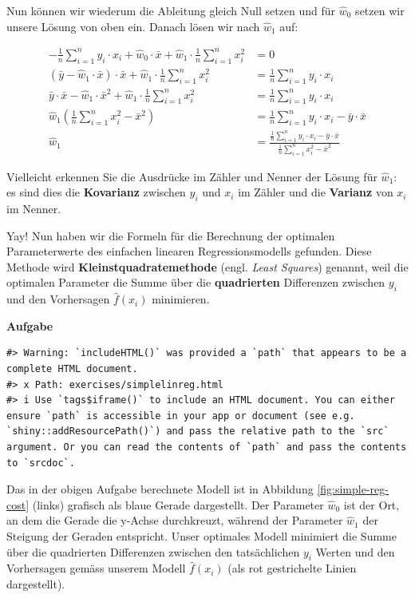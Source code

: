 \documentclass[
]{book}
\begin{document}
Nun können wir wiederum die Ableitung gleich Null setzen und für \(\hat{w}_0\) setzen wir unsere Lösung von oben ein. Danach lösen wir nach \(\hat{w}_1\) auf:

\begin{align}
-\frac{1}{n} \sum_{i=1}^{n} y_i \cdot x_i + \hat{w}_0 \cdot \bar{x} + \hat{w}_1 \cdot \frac{1}{n} \sum_{i=1}^{n} x_i^2 &= 0 \\
(\bar{y} - \hat{w}_1 \cdot \bar{x}) \cdot \bar{x} + \hat{w}_1 \cdot \frac{1}{n} \sum_{i=1}^{n} x_i^2 &= \frac{1}{n} \sum_{i=1}^{n} y_i \cdot x_i \\
\bar{y} \cdot \bar{x} - \hat{w}_1 \cdot \bar{x}^2 + \hat{w}_1 \cdot \frac{1}{n} \sum_{i=1}^{n} x_i^2 &= \frac{1}{n} \sum_{i=1}^{n} y_i \cdot x_i \\
\hat{w}_1 \left(\frac{1}{n} \sum_{i=1}^{n} x_i^2 - \bar{x}^2 \right) &= \frac{1}{n} \sum_{i=1}^{n} y_i \cdot x_i - \bar{y} \cdot \bar{x} \\
\hat{w}_1 &= \frac{\frac{1}{n} \sum_{i=1}^{n} y_i \cdot x_i - \bar{y} \cdot \bar{x}}{\frac{1}{n} \sum_{i=1}^{n} x_i^2 - \bar{x}^2}
\end{align}

Vielleicht erkennen Sie die Ausdrücke im Zähler und Nenner der Lösung für \(\hat{w}_1\): es sind dies die \textbf{Kovarianz} zwischen \(y_i\) und \(x_i\) im Zähler und die \textbf{Varianz} von \(x_i\) im Nenner.

Yay! Nun haben wir die Formeln für die Berechnung der optimalen Parameterwerte des einfachen linearen Regressionsmodells gefunden. Diese Methode wird \textbf{Kleinstquadratemethode} (engl. \emph{Least Squares}) genannt, weil die optimalen Parameter die Summe über die \textbf{quadrierten} Differenzen zwischen \(y_i\) und den Vorhersagen \(\hat{f}(x_i)\) minimieren.

\textbf{Aufgabe}

\begin{verbatim}
#> Warning: `includeHTML()` was provided a `path` that appears to be a complete HTML document.
#> x Path: exercises/simplelinreg.html
#> i Use `tags$iframe()` to include an HTML document. You can either ensure `path` is accessible in your app or document (see e.g. `shiny::addResourcePath()`) and pass the relative path to the `src` argument. Or you can read the contents of `path` and pass the contents to `srcdoc`.
\end{verbatim}

Das in der obigen Aufgabe berechnete Modell ist in Abbildung \ref{fig:simple-reg-cost} (links) grafisch als blaue Gerade dargestellt. Der Parameter \(\hat{w}_0\) ist der Ort, an dem die Gerade die y-Achse durchkreuzt, während der Parameter \(\hat{w}_1\) der Steigung der Geraden entspricht. Unser optimales Modell minimiert die Summe über die quadrierten Differenzen zwischen den tatsächlichen \(y_i\) Werten und den Vorhersagen gemäss unserem Modell \(\hat{f}(x_i)\) (als rot gestrichelte Linien dargestellt).
\end{document}
